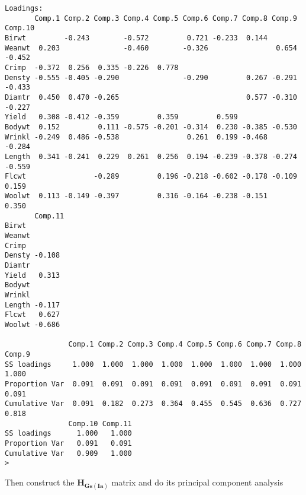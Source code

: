 \documentclass[titlepage]{article}  %
\begin{document}
\begin{verbatim}
Loadings:
       Comp.1 Comp.2 Comp.3 Comp.4 Comp.5 Comp.6 Comp.7 Comp.8 Comp.9 Comp.10
Birwt         -0.243        -0.572         0.721 -0.233  0.144               
Weanwt  0.203               -0.460        -0.326                0.654 -0.452 
Crimp  -0.372  0.256  0.335 -0.226  0.778                                    
Densty -0.555 -0.405 -0.290               -0.290         0.267 -0.291 -0.433 
Diamtr  0.450  0.470 -0.265                              0.577 -0.310 -0.227 
Yield   0.308 -0.412 -0.359         0.359         0.599                      
Bodywt  0.152         0.111 -0.575 -0.201 -0.314  0.230 -0.385 -0.530        
Wrinkl -0.249  0.486 -0.538                0.261  0.199 -0.468        -0.284 
Length  0.341 -0.241  0.229  0.261  0.256  0.194 -0.239 -0.378 -0.274 -0.559 
Flcwt                -0.289         0.196 -0.218 -0.602 -0.178 -0.109  0.159 
Woolwt  0.113 -0.149 -0.397         0.316 -0.164 -0.238 -0.151         0.350 
       Comp.11
Birwt         
Weanwt        
Crimp         
Densty -0.108 
Diamtr        
Yield   0.313 
Bodywt        
Wrinkl        
Length -0.117 
Flcwt   0.627 
Woolwt -0.686 

               Comp.1 Comp.2 Comp.3 Comp.4 Comp.5 Comp.6 Comp.7 Comp.8 Comp.9
SS loadings     1.000  1.000  1.000  1.000  1.000  1.000  1.000  1.000  1.000
Proportion Var  0.091  0.091  0.091  0.091  0.091  0.091  0.091  0.091  0.091
Cumulative Var  0.091  0.182  0.273  0.364  0.455  0.545  0.636  0.727  0.818
               Comp.10 Comp.11
SS loadings      1.000   1.000
Proportion Var   0.091   0.091
Cumulative Var   0.909   1.000
> 
\end{verbatim}

 Then construct the $\bm{H_{Gs(Ia)}}$ matrix and do its principal component analysis
\end{document}
